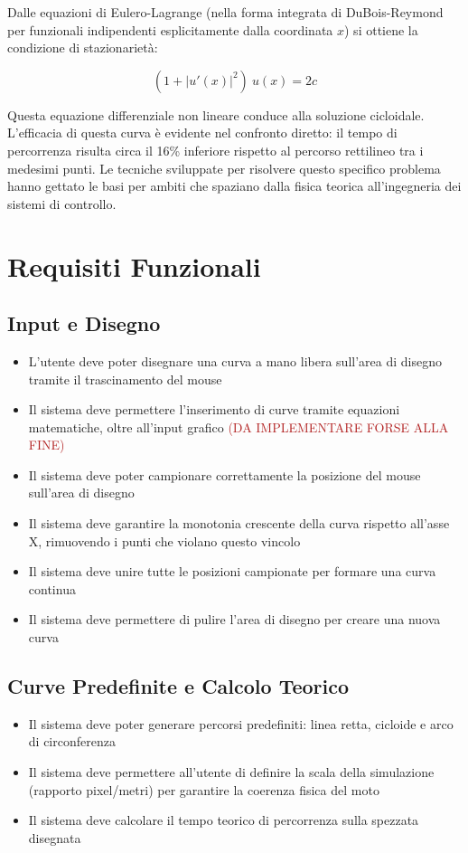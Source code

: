 \documentclass[a4paper,12pt]{article} %
\begin{document}
Dalle equazioni di Eulero-Lagrange (nella forma integrata di DuBois-Reymond per funzionali indipendenti esplicitamente dalla coordinata $x$) si ottiene la condizione di stazionarietà:

\[
    (1 + |u'(x)|^2) \ u(x) = 2c
\]

Questa equazione differenziale non lineare conduce alla soluzione cicloidale. L'efficacia di questa curva è evidente nel confronto diretto: il tempo di percorrenza risulta circa il 16\% inferiore rispetto al percorso rettilineo tra i medesimi punti. Le tecniche sviluppate per risolvere questo specifico problema hanno gettato le basi per ambiti che spaziano dalla fisica teorica all'ingegneria dei sistemi di controllo.

\section{Requisiti Funzionali}

\subsection{Input e Disegno}

\begin{itemize}
    \item L'utente deve poter disegnare una curva a mano libera sull'area di disegno tramite il trascinamento del mouse
    \item Il sistema deve permettere l'inserimento di curve tramite equazioni matematiche, oltre all'input grafico \textcolor{firebrick}{(DA IMPLEMENTARE FORSE ALLA FINE)}
    \item Il sistema deve poter campionare correttamente la posizione del mouse sull'area di disegno
    \item Il sistema deve garantire la monotonia crescente della curva rispetto all'asse X, rimuovendo i punti che violano questo vincolo
    \item Il sistema deve unire tutte le posizioni campionate per formare una curva continua
    \item Il sistema deve permettere di pulire l'area di disegno per creare una nuova curva
\end{itemize}

\subsection{Curve Predefinite e Calcolo Teorico}

\begin{itemize}
    \item Il sistema deve poter generare percorsi predefiniti: linea retta, cicloide e arco di circonferenza
    \item Il sistema deve permettere all'utente di definire la scala della simulazione (rapporto pixel/metri) per garantire la coerenza fisica del moto
    \item Il sistema deve calcolare il tempo teorico di percorrenza sulla spezzata disegnata
\end{itemize}
\end{document}
